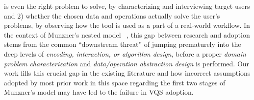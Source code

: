 {  \par {} is even the right problem to solve, by characterizing and interviewing target users and 2) whether the chosen data and operations actually solve the user's problems, by observing how the tool is used as a part of a real-world workflow. In the context of Munzner's nested model ~\cite{munzner2009nested}, this gap between research and adoption stems from the common ``downstream threat'' of jumping prematurely into the deep levels of \textit{encoding, interaction, or algorithm design}, before a proper \textit{domain problem characterization} and \textit{data/operation abstraction design} is performed. Our work fills this crucial gap in the existing literature and  how incorrect assumptions adopted by most prior work in this space regarding the first two stages of Munzner's model may have led to the  failure in VQS adoption.
}
